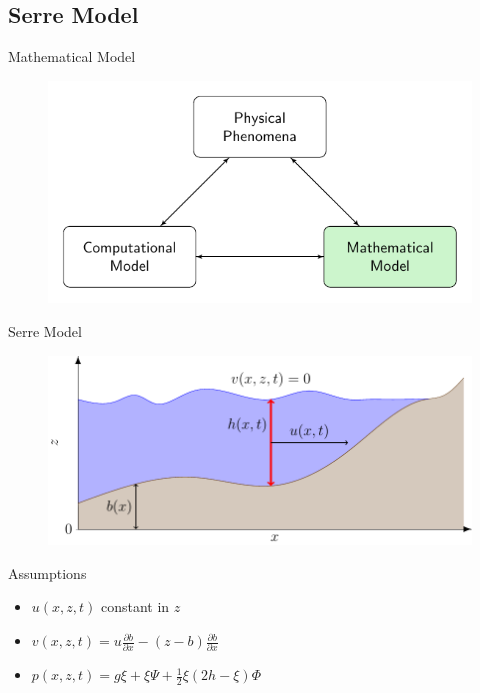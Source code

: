 \documentclass[pdf]{beamer}
\begin{document}
\subsection{Serre Model}
\begin{frame}{Mathematical Model}
	\begin{figure}
		\includegraphics[width=\textwidth]{./Pics/ModelDiagrams/FlowChartHigh2G.pdf}
	\end{figure}
\end{frame}
\begin{frame}{Serre Model}
	\begin{figure}
		\includegraphics[width=\textwidth]{./Pics/WaterModelDiagrams/SWWE.pdf}
	\end{figure}
\end{frame}
\begin{frame}{Assumptions}
	\begin{itemize}
		\item $u(x,z,t)$ constant in $z$
		\item $v(x,z,t) = u\frac{\partial b}{\partial x} - (z - b)\frac{\partial b}{\partial x}$
		\item $p(x,z,t) = g\xi  + \xi \Psi + \frac{1}{2} \xi \left(2h - \xi\right) \Phi$
	\end{itemize}
\end{frame}
\end{document}

